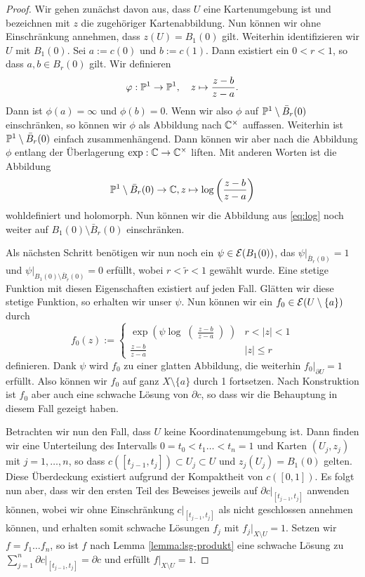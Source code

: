 \begin{proof}
  Wir gehen zunächst davon aus, dass $U$ eine Kartenumgebung ist und
  bezeichnen mit $z$ die zugehöriger Kartenabbildung. Nun können wir
  ohne Einschränkung annehmen, dass $z(U) = B_1(0)$ gilt. Weiterhin
  identifizieren wir $U$ mit $B_1(0)$. Sei $a := c(0)$ und $b :=
  c(1)$. Dann existiert ein $0 < r < 1$, so dass $a, b \in B_r(0)$
  gilt. Wir definieren
  \[
  \phi: \P^1 \ra \P^1, \quad z \mapsto \frac{z-b}{z-a}.
  \]
  Dann ist $\phi(a) = \infty$ und $\phi(b) = 0$. Wenn wir also $\phi$
  auf $\P^1 \setminus \bar B_r(0)$ einschränken, so können wir $\phi$
  als Abbildung nach $\C^\times$ auffassen. Weiterhin ist $\P^1
  \setminus \bar B_r(0)$ einfach zusammenhängend. Dann können wir aber
  nach \cite[Beispiel 4.18]{For} die Abbildung $\phi$ entlang der
  Überlagerung $\exp: \C \ra \C^\times$ liften. Mit anderen Worten ist
  die Abbildung
  \begin{align}
    \label{eq:log}
  \P^1\setminus \bar B_r(0) \ra \C, z \mapsto \log \left (
    \frac{z-b}{z-a} \right )
  \end{align}
  wohldefiniert und holomorph. Nun können wir die Abbildung aus
  \eqref{eq:log} noch weiter auf $B_1(0) \setminus \bar B_r(0)$
  einschränken.

  Als nächsten Schritt benötigen wir nun noch ein $\psi \in
  \diff(B_1(0))$, das $\psi|_{\bar B_r(0)} = 1$ und $\psi|_{B_1(0)
    \setminus \bar B_{\tilde r}(0)} = 0$ erfüllt, wobei $r <
  \tilde r <1$
  gewählt wurde. Eine stetige Funktion mit diesen Eigenschaften
  existiert auf jeden Fall. Glätten wir diese stetige Funktion, so
  erhalten wir unser $\psi$. Nun können wir ein $f_0 \in \diff(U
  \setminus \{a\})$ durch
  \[
  f_0(z) :=
  \begin{cases}
    \exp \left (\psi \log \middle ( \frac{z-b}{z-a} \middle ) \right
    ) & r < |z| <1 \\
    \frac{z-b}{z-a} & |z| \leq r
  \end{cases}
  \]
  definieren. Dank $\psi$ wird $f_0$ zu einer glatten Abbildung, die
  weiterhin $f_0|_{\partial U} = 1$ erfüllt. Also können wir
  $f_0$ auf ganz $X \setminus \{a\}$ durch 1 fortsetzen. Nach
  Konstruktion ist $f_0$ aber auch eine schwache Lösung von
  $\partial c$, so dass wir die Behauptung in diesem Fall gezeigt
  haben.

  Betrachten wir nun den Fall, dass $U$ keine Koordinatenumgebung
  ist. Dann finden wir eine Unterteilung des Intervalls $0= t_0 <
  t_1 \dots < t_n = 1$ und Karten $(U_j,z_j)$ mit \break $j = 1, \dots,
  n$, so dass $c([t_{j-1}, t_j]) \subset U_j \subset U$ und
  $z_j(U_j) = B_1(0)$ gelten. Diese Überdeckung existiert aufgrund
  der Kompaktheit von $c([0,1])$. Es folgt nun aber, dass wir den
  ersten Teil des Beweises jeweils auf $\partial c|_{[t_{j-1},t_j]}$
  anwenden können, wobei wir ohne Einschränkung $c|_{[t_{j-1},t_j]}$
  als nicht geschlossen annehmen können, und erhalten somit schwache Lösungen $f_j$ mit $f_j|_{X
    \setminus U} = 1$.
  Setzen wir $f = f_1 \dots f_n$, so ist $f$ nach Lemma
  \ref{lemma:lsg-produkt} eine schwache Lösung zu
  $\sum_{j=1}^n \partial c|_{[t_{j-1},t_j]} = \partial c$ und
  erfüllt $f|_{X \setminus U} = 1$.
\end{proof}

